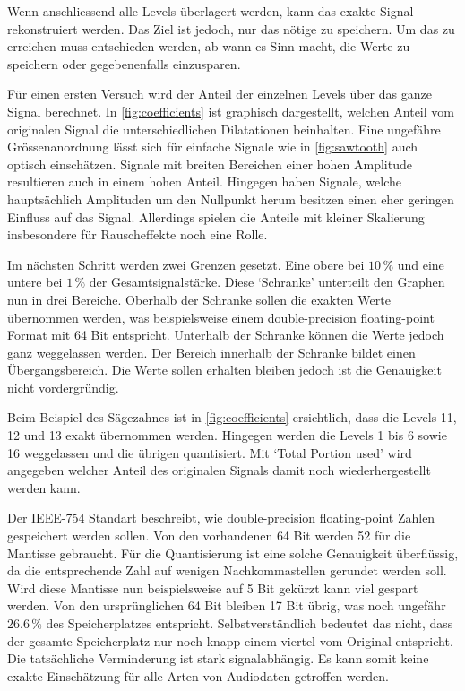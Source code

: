 \begin{refsection}
Wenn anschliessend alle Levels überlagert werden, kann das exakte Signal rekonstruiert werden.
Das Ziel ist jedoch, nur das nötige zu speichern.
Um das zu erreichen muss entschieden werden, ab wann es Sinn macht, die Werte zu speichern oder gegebenenfalls einzusparen.

Für einen ersten Versuch wird der Anteil der einzelnen Levels über das ganze Signal berechnet.
In \autoref{fig:coefficients} ist graphisch dargestellt, welchen Anteil vom originalen Signal die unterschiedlichen Dilatationen beinhalten.
Eine ungefähre Grössenanordnung lässt sich für einfache Signale wie in \autoref{fig:sawtooth} auch optisch einschätzen.
Signale mit breiten Bereichen einer hohen Amplitude resultieren auch in einem hohen Anteil. 
Hingegen haben Signale, welche hauptsächlich Amplituden um den Nullpunkt herum besitzen einen eher geringen Einfluss auf das Signal.
Allerdings spielen die Anteile mit kleiner Skalierung insbesondere für Rauscheffekte noch eine Rolle.

Im nächsten Schritt werden zwei Grenzen gesetzt.
Eine obere bei  $10\,\text{\%}$ und eine untere bei $1\,\text{\%}$ der Gesamtsignalstärke.
Diese `Schranke' unterteilt den Graphen nun in drei Bereiche. 
Oberhalb der Schranke sollen die exakten Werte übernommen werden, was beispielsweise einem double-precision floating-point Format mit 64 Bit entspricht.
Unterhalb der Schranke können die Werte jedoch ganz weggelassen werden.
Der Bereich innerhalb der Schranke bildet einen Übergangsbereich.
Die Werte sollen erhalten bleiben jedoch ist die Genauigkeit nicht vordergründig.

Beim Beispiel des Sägezahnes ist in \autoref{fig:coefficients} ersichtlich, dass die Levels 11, 12 und 13 exakt übernommen werden.
Hingegen werden die Levels 1 bis 6 sowie 16 weggelassen und die übrigen quantisiert.
Mit `Total Portion used' wird angegeben welcher Anteil des originalen Signals damit noch wiederhergestellt werden kann.

Der IEEE-754 Standart \cite{article:IEEE-754} beschreibt, wie double-precision floating-point Zahlen gespeichert werden sollen. 
Von den vorhandenen 64 Bit werden 52 für die Mantisse gebraucht.
Für die Quantisierung ist eine solche Genauigkeit überflüssig, da die entsprechende Zahl auf wenigen Nachkommastellen gerundet werden soll.
Wird diese Mantisse nun beispielsweise auf 5 Bit gekürzt kann viel gespart werden.
Von den ursprünglichen 64 Bit bleiben 17 Bit übrig, was noch ungefähr $26.6\,\text{\%}$ des Speicherplatzes entspricht.
Selbstverständlich bedeutet das nicht, dass der gesamte Speicherplatz nur noch knapp einem viertel vom Original entspricht. 
Die tatsächliche Verminderung ist stark signalabhängig.
Es kann somit keine exakte Einschätzung für alle Arten von Audiodaten getroffen werden. 


\end{refsection}
